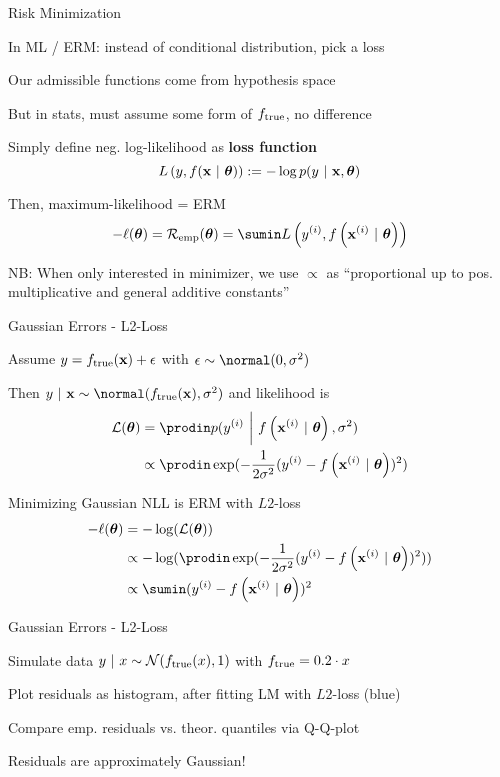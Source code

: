 \documentclass[11pt,compress,t,notes=noshow, xcolor=table]{beamer}
\begin{document}
\begin{framei}[sep=M]{Risk Minimization} 

\item In ML / ERM: instead of conditional distribution, pick a loss 
\item Our admissible functions come from hypothesis space 
\item But in stats, must assume some form of $f_{\text{true}}$, no difference

\item Simply define neg. log-likelihood as \textbf{loss function} 
$$ L\left(y, f(\mathbf{x} ~|~ \bm{\theta})\right) := - \log p(y ~|~\mathbf{x}, \bm{\theta}) $$
\item Then, maximum-likelihood 
 = ERM
$$- \loglt = \risket = \sumin \Lxyit$$

\item NB: When only interested in minimizer, we use $\propto$ as \enquote{proportional up to pos. multiplicative and general additive constants}

\end{framei}


\begin{framei}[sep=M]{Gaussian Errors - L2-Loss} 

\item Assume $y = f_{\text{true}}(\mathbf{x}) + \epsilon$ with $\eps \sim \normal(0, \sigma^2)$ 
\item Then $y~|~\xv \sim \normal(\ftrue(\xv), \sigma^2)$ and likelihood is 
{\small
\begin{align*}
\LL(\thetav) &= \prodin \pdf(\yi ~\bigg|~ \fxit, \sigma^2) \\ &\propto \prodin \exp(-\frac{1}{2\sigma^2} (\yi - \fxit)^2)
\end{align*}
}


\item Minimizing Gaussian NLL is ERM with $L2$-loss
{\small
\begin{align*}
- \loglt &= - \log(\LL(\thetav)) \\
&\propto - \log(\prodin \exp(-\frac{1}{2\sigma^2} (\yi - \fxit)^2)) \\
&\propto \sumin (\yi - \fxit)^2
\end{align*}
}

\end{framei}
\begin{framei}[sep=M]{Gaussian Errors - L2-Loss} 

\item Simulate data $y ~|~x \sim \mathcal{N}(f_{\text{true}}(x), 1)$ with $f_{\text{true}} = 0.2 \cdot x$ 
\item Plot residuals as histogram, after fitting LM with $L2$-loss (blue)
\item Compare emp. residuals vs. theor. quantiles via Q-Q-plot




\item Residuals are approximately Gaussian!

\end{framei}
\end{document}
